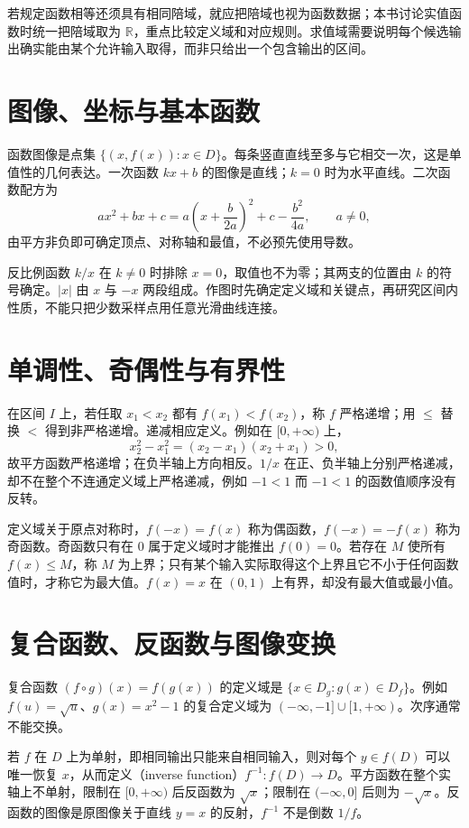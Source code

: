 \documentclass[UTF8]{ctexbook}
\begin{document}
若规定函数相等还须具有相同陪域，就应把陪域也视为函数数据；本书讨论实值函数时统一把陪域取为 $\mathbb R$，重点比较定义域和对应规则。求值域需要说明每个候选输出确实能由某个允许输入取得，而非只给出一个包含输出的区间。

\section{图像、坐标与基本函数}
函数图像是点集 $\{(x,f(x)):x\in D\}$。每条竖直直线至多与它相交一次，这是单值性的几何表达。一次函数 $kx+b$ 的图像是直线；$k=0$ 时为水平直线。二次函数配方为
\[
 ax^2+bx+c=a\left(x+\frac b{2a}\right)^2+c-\frac{b^2}{4a},\qquad a\ne0,
\]
由平方非负即可确定顶点、对称轴和最值，不必预先使用导数。

反比例函数 $k/x$ 在 $k\ne0$ 时排除 $x=0$，取值也不为零；其两支的位置由 $k$ 的符号确定。$|x|$ 由 $x$ 与 $-x$ 两段组成。作图时先确定定义域和关键点，再研究区间内性质，不能只把少数采样点用任意光滑曲线连接。

\section{单调性、奇偶性与有界性}
在区间 $I$ 上，若任取 $x_1<x_2$ 都有 $f(x_1)<f(x_2)$，称 $f$ 严格递增；用 $\le$ 替换 $<$ 得到非严格递增。递减相应定义。例如在 $[0,+\infty)$ 上，
\[
 x_2^2-x_1^2=(x_2-x_1)(x_2+x_1)>0,
\]
故平方函数严格递增；在负半轴上方向相反。$1/x$ 在正、负半轴上分别严格递减，却不在整个不连通定义域上严格递减，例如 $-1<1$ 而 $-1<1$ 的函数值顺序没有反转。

定义域关于原点对称时，$f(-x)=f(x)$ 称为偶函数，$f(-x)=-f(x)$ 称为奇函数。奇函数只有在 $0$ 属于定义域时才能推出 $f(0)=0$。若存在 $M$ 使所有 $f(x)\le M$，称 $M$ 为上界；只有某个输入实际取得这个上界且它不小于任何函数值时，才称它为最大值。$f(x)=x$ 在 $(0,1)$ 上有界，却没有最大值或最小值。

\section{复合函数、反函数与图像变换}
复合函数 $(f\circ g)(x)=f(g(x))$ 的定义域是 $\{x\in D_g:g(x)\in D_f\}$。例如 $f(u)=\sqrt u$、$g(x)=x^2-1$ 的复合定义域为 $(-\infty,-1]\cup[1,+\infty)$。次序通常不能交换。

若 $f$ 在 $D$ 上为单射，即相同输出只能来自相同输入，则对每个 $y\in f(D)$ 可以唯一恢复 $x$，从而定义（inverse function）$f^{-1}:f(D)\to D$。平方函数在整个实轴上不单射，限制在 $[0,+\infty)$ 后反函数为 $\sqrt x$；限制在 $(-\infty,0]$ 后则为 $-\sqrt x$。反函数的图像是原图像关于直线 $y=x$ 的反射，$f^{-1}$ 不是倒数 $1/f$。
\end{document}
